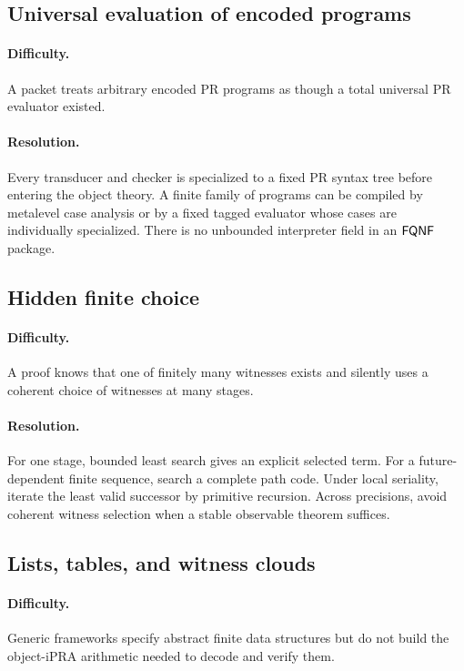 \subsection{Universal evaluation of encoded programs}

\paragraph{Difficulty.}
A packet treats arbitrary encoded PR programs as though a total universal PR
evaluator existed.

\paragraph{Resolution.}
Every transducer and checker is specialized to a fixed \(\mathrm{PR}\) syntax
tree before entering the object theory.  A finite family of programs can be
compiled by metalevel case analysis or by a fixed tagged evaluator whose cases
are individually specialized.  There is no unbounded interpreter field in an
\(\mathsf{FQNF}\) package.

\subsection{Hidden finite choice}

\paragraph{Difficulty.}
A proof knows that one of finitely many witnesses exists and silently uses a
coherent choice of witnesses at many stages.

\paragraph{Resolution.}
For one stage, bounded least search gives an explicit selected term.  For a
future-dependent finite sequence, search a complete path code.  Under local
seriality, iterate the least valid successor by primitive recursion.  Across
precisions, avoid coherent witness selection when a stable observable theorem
suffices.

\subsection{Lists, tables, and witness clouds}

\paragraph{Difficulty.}
Generic frameworks specify abstract finite data structures but do not build the
object-iPRA arithmetic needed to decode and verify them.

